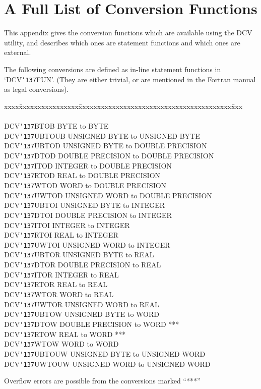 \documentclass[twoside,11pt]{article}
\renewcommand{\_}{{\tt\char'137}}     %
\newcommand{\xlabel}[1]{}
\begin{document}
\section{\xlabel{ap_b}A Full List of Conversion Functions\label{ap_b}}

This appendix gives the conversion functions which are available using
the DCV utility, and describes which ones are statement functions and
which ones are external.

The following conversions are defined as in-line statement functions in
`DCV\_FUN'. (They are either trivial, or are mentioned in the Fortran
manual as legal conversions).

\begin{tabbing}
xxxx\=xxxxxxxxxxxxxxxx\=xxxxxxxxxxxxxxxxxxxxxxxxxxxxxxxxxxxxxxxxx\=xxx\kill
{}   \\
\\
\>DCV\_BTOB   \>BYTE to BYTE \\
\>DCV\_UBTOUB \>UNSIGNED BYTE to UNSIGNED BYTE \\
\>DCV\_UBTOD  \>UNSIGNED BYTE to DOUBLE PRECISION \\
\>DCV\_DTOD   \>DOUBLE PRECISION to DOUBLE PRECISION \\
\>DCV\_ITOD   \>INTEGER to DOUBLE PRECISION \\
\>DCV\_RTOD   \>REAL to DOUBLE PRECISION \\
\>DCV\_WTOD   \>WORD to DOUBLE PRECISION \\
\>DCV\_UWTOD  \>UNSIGNED WORD to DOUBLE PRECISION \\
\>DCV\_UBTOI  \>UNSIGNED BYTE to INTEGER \\
\>DCV\_DTOI   \>DOUBLE PRECISION to INTEGER \\
\>DCV\_ITOI   \>INTEGER to INTEGER \\
\>DCV\_RTOI   \>REAL to INTEGER \\
\>DCV\_UWTOI  \>UNSIGNED WORD to INTEGER \\
\>DCV\_UBTOR  \>UNSIGNED BYTE to REAL \\
\>DCV\_DTOR   \>DOUBLE PRECISION to REAL \\
\>DCV\_ITOR   \>INTEGER to REAL \\
\>DCV\_RTOR   \>REAL to REAL \\
\>DCV\_WTOR   \>WORD to REAL \\
\>DCV\_UWTOR  \>UNSIGNED WORD to REAL \\
\>DCV\_UBTOW  \>UNSIGNED BYTE to WORD \\
\>DCV\_DTOW   \>DOUBLE PRECISION to WORD       \>*** \\
\>DCV\_RTOW   \>REAL to WORD                   \>*** \\
\>DCV\_WTOW   \>WORD to WORD \\
\>DCV\_UBTOUW \>UNSIGNED BYTE to UNSIGNED WORD \\
\>DCV\_UWTOUW \>UNSIGNED WORD to UNSIGNED WORD \\
\end{tabbing}
Overflow errors are possible from the conversions marked ``***''
\end{document}
